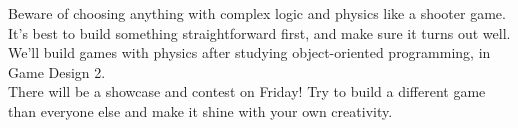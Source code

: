 \documentclass{42-en}
\begin{document}
Beware of choosing anything with complex logic and physics like a shooter game. It's best to build something straightforward first, and make sure it turns out well. We'll build games with physics after studying object-oriented programming, in Game Design 2.\\

There will be a showcase and contest on Friday! Try to build a different game than everyone else and make it shine with your own creativity.\\
\end{document}
